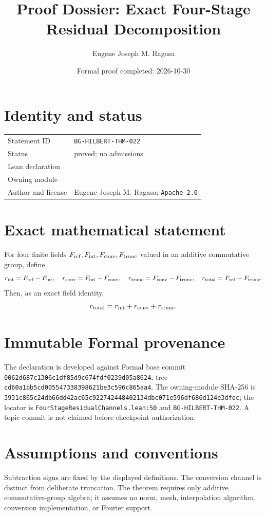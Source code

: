 \documentclass[11pt]{article}
\title{Proof Dossier: Exact Four-Stage Residual Decomposition}
\author{Eugene Joseph M. Ragasa}
\date{Formal proof completed: 2026-10-30}
\begin{document}
\raggedright
\maketitle
\section{Identity and status}
\begin{tabularx}{\textwidth}{@{}lY@{}}
\toprule
Statement ID & \texttt{BG-HILBERT-THM-022} \\
Status & proved; no admissions \\
Lean declaration &  \\
Owning module &  \\
Author and license & Eugene Joseph M. Ragasa; \texttt{Apache-2.0} \\
\bottomrule
\end{tabularx}

\section{Exact mathematical statement}
For four finite fields $F_{\rm ref},F_{\rm int},F_{\rm conv},F_{\rm trunc}$ valued in an additive commutative group, define
\[
r_{\rm int}=F_{\rm ref}-F_{\rm int},\quad
r_{\rm conv}=F_{\rm int}-F_{\rm conv},\quad
r_{\rm trunc}=F_{\rm conv}-F_{\rm trunc},\quad
r_{\rm total}=F_{\rm ref}-F_{\rm trunc}.
\]
Then, as an exact field identity,
\[
 r_{\rm total}=r_{\rm int}+r_{\rm conv}+r_{\rm trunc}.
\]

\section{Immutable Formal provenance}
The declaration is developed against Formal base commit
\texttt{0062d687c1306c1df85d9c674fdf0239d05a8624}, tree
\texttt{cd60a1bb5cd005547338398621be3c596c865aa4}. The owning-module SHA-256 is
\texttt{3931c865c24db66dd42ac65c922742448402134dbc071e596df686d124e3dfec}; the locator is
\texttt{FourStageResidualChannels.lean:50} and \texttt{BG-HILBERT-THM-022}. A topic commit is not claimed before checkpoint authorization.

\section{Assumptions and conventions}
Subtraction signs are fixed by the displayed definitions. The conversion channel is distinct from deliberate truncation. The theorem requires only additive commutative-group algebra; it assumes no norm, mesh, interpolation algorithm, conversion implementation, or Fourier support.
\end{document}
